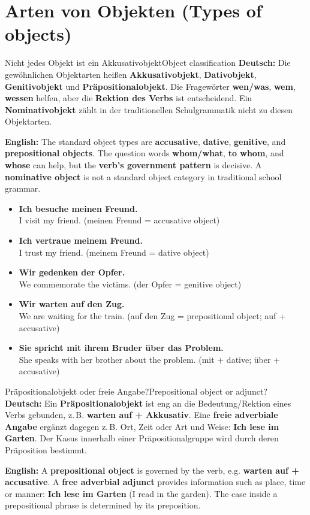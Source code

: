 \documentclass[a4paper,11pt]{article}
\newcommand{\GermanText}[1]{\textbf{Deutsch: }#1\par}
\newcommand{\EnglishText}[1]{{\small\color{SoftGray}\textbf{English: }#1\par}}
\newcommand{\ExampleItem}[2]{\item \textbf{#1}\\{\small\color{SoftGray}#2}}
\begin{document}
    \section{Arten von Objekten \textnormal{(Types of objects)}}
        \begin{grammarentry}{Nicht jedes Objekt ist ein Akkusativobjekt}{Object classification}
            \GermanText{Die gewöhnlichen Objektarten heißen \textbf{Akkusativobjekt}, \textbf{Dativobjekt}, \textbf{Genitivobjekt} und \textbf{Präpositionalobjekt}. Die Fragewörter \textbf{wen/was}, \textbf{wem}, \textbf{wessen} helfen, aber die \textbf{Rektion des Verbs} ist entscheidend. Ein \textbf{Nominativobjekt} zählt in der traditionellen Schulgrammatik nicht zu diesen Objektarten.}
            \EnglishText{The standard object types are \textbf{accusative}, \textbf{dative}, \textbf{genitive}, and \textbf{prepositional objects}. The question words \textbf{whom/what}, \textbf{to whom}, and \textbf{whose} can help, but the \textbf{verb's government pattern} is decisive. A \textbf{nominative object} is not a standard object category in traditional school grammar.}
        \end{grammarentry}
        \begin{exbox}\begin{itemize}
            \ExampleItem{Ich besuche meinen Freund.}{I visit my friend. (meinen Freund = accusative object)}
            \ExampleItem{Ich vertraue meinem Freund.}{I trust my friend. (meinem Freund = dative object)}
            \ExampleItem{Wir gedenken der Opfer.}{We commemorate the victims. (der Opfer = genitive object)}
            \ExampleItem{Wir warten auf den Zug.}{We are waiting for the train. (auf den Zug = prepositional object; auf + accusative)}
            \ExampleItem{Sie spricht mit ihrem Bruder über das Problem.}{She speaks with her brother about the problem. (mit + dative; über + accusative)}
        \end{itemize}\end{exbox}
        \begin{grammarentry}{Präpositionalobjekt oder freie Angabe?}{Prepositional object or adjunct?}
            \GermanText{Ein \textbf{Präpositionalobjekt} ist eng an die Bedeutung/Rektion eines Verbs gebunden, z.\,B. \textbf{warten auf + Akkusativ}. Eine \textbf{freie adverbiale Angabe} ergänzt dagegen z.\,B. Ort, Zeit oder Art und Weise: \textbf{Ich lese im Garten}. Der Kasus innerhalb einer Präpositionalgruppe wird durch deren Präposition bestimmt.}
            \EnglishText{A \textbf{prepositional object} is governed by the verb, e.g. \textbf{warten auf + accusative}. A \textbf{free adverbial adjunct} provides information such as place, time or manner: \textbf{Ich lese im Garten} (I read in the garden). The case inside a prepositional phrase is determined by its preposition.}
        \end{grammarentry}
\end{document}
